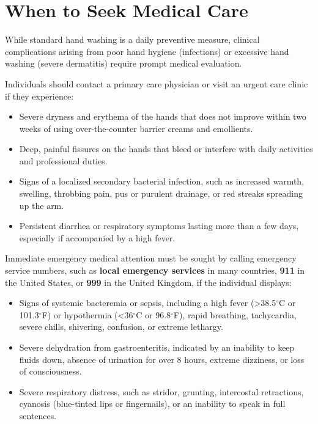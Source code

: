 \section*{When to Seek Medical Care}
While standard hand washing is a daily preventive measure, clinical complications arising from poor hand hygiene (infections) or excessive hand washing (severe dermatitis) require prompt medical evaluation.

Individuals should contact a primary care physician or visit an urgent care clinic if they experience:
\begin{itemize}
    \item Severe dryness and erythema of the hands that does not improve within two weeks of using over-the-counter barrier creams and emollients.
    \item Deep, painful fissures on the hands that bleed or interfere with daily activities and professional duties.
    \item Signs of a localized secondary bacterial infection, such as increased warmth, swelling, throbbing pain, pus or purulent drainage, or red streaks spreading up the arm.
    \item Persistent diarrhea or respiratory symptoms lasting more than a few days, especially if accompanied by a high fever.
\end{itemize}

Immediate emergency medical attention must be sought by calling emergency service numbers, such as \textbf{local emergency services} in many countries, \textbf{911} in the United States, or \textbf{999} in the United Kingdom, if the individual displays:
\begin{itemize}
    \item Signs of systemic bacteremia or sepsis, including a high fever (>38.5$^\circ$C or 101.3$^\circ$F) or hypothermia (<36$^\circ$C or 96.8$^\circ$F), rapid breathing, tachycardia, severe chills, shivering, confusion, or extreme lethargy.
    \item Severe dehydration from gastroenteritis, indicated by an inability to keep fluids down, absence of urination for over 8 hours, extreme dizziness, or loss of consciousness.
    \item Severe respiratory distress, such as stridor, grunting, intercostal retractions, cyanosis (blue-tinted lips or fingernails), or an inability to speak in full sentences.
\end{itemize}

